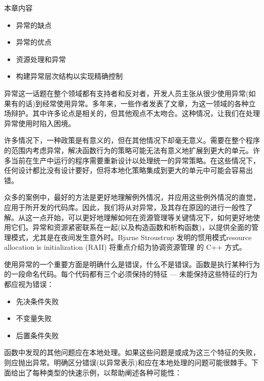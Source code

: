 本章内容

\begin{itemize}
\item
异常的缺点

\item
异常的优点

\item
资源处理和异常

\item
构建异常层次结构以实现精确控制
\end{itemize}

异常这一话题在整个领域都有支持者和反对者，开发人员主张从很少使用异常(如果有的话)到经常使用异常。多年来，一些作者发表了文章，为这一领域的各种立场辩护。其中许多论点是相关的，但其他观点不太吻合。这种情况，让我们在处理异常使用时陷入困境。

许多情况下，一种政策是有意义的，但在其他情况下却毫无意义。需要在整个程序的范围内考虑异常，解决函数行为的策略可能无法有意义地扩展到更大的单元。许多当前在生产中运行的程序需要重新设计以处理统一的异常策略。在这些情况下，任何设计都比没有设计要好，但将本地化策略集成到更大的单元中可能会容易出错。

众多的案例中，最好的方法是更好地理解例外情况，并应用这些例外情况的直觉，应用于所开发的代码库。因此，我们将从对异常，及其存在原因的进行一般性了解。从这一点开始，可以更好地理解如何在资源管理等关键情况下，如何更好地使用它们。异常和资源紧密联系在一起(以及构造函数和析构函数)，以提供全面的管理模式，尤其是在夜间发生意外时。Bjarne Stroustrup 发明的惯用模式resource allocation is initialization (RAII) 将重点介绍为协调资源管理 的 C++ 方式。

使用异常的一个重要方面是明确什么是错误，什么不是错误。函数是执行某种行为的一段命名代码。每个代码都有三个必须保持的特征 — 未能保持这些特征的行为都应视为错误：

\begin{itemize}
\item
先决条件失败

\item
不变量失败

\item
后置条件失败
\end{itemize}

函数中发现的其他问题应在本地处理。如果这些问题是或成为这三个特征的失败，则应抛出异常。明确区分错误(以异常表示)和应在本地处理的问题可能很棘手。下面给出了每种类型的快速示例，以帮助阐述各种可能性：

